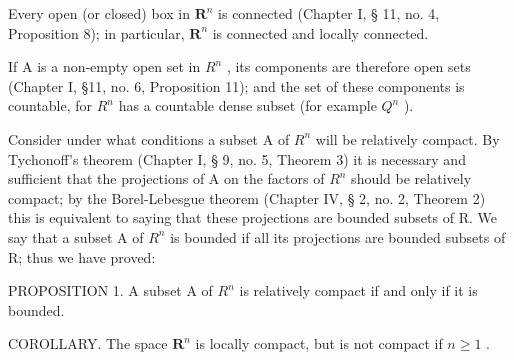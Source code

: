 Every open (or closed) box in \(\mathbf{R}^n\) is connected (Chapter I, § 11, no. 4, Proposition 8); in particular, \(\mathbf{R}^n\) is connected and locally connected.

If A is a non-empty open set in \(R^{n}\) , its components are therefore open sets (Chapter I, §11, no. 6, Proposition 11); and the set of these components is countable, for \(R^{n}\) has a countable dense subset (for example \(Q^{n}\) ).

Consider under what conditions a subset A of \(R^{n}\) will be relatively compact. By Tychonoff's theorem (Chapter I, § 9, no. 5, Theorem 3) it is necessary and sufficient that the projections of A on the factors of \(R^{n}\) should be relatively compact; by the Borel-Lebesgue theorem (Chapter IV, § 2, no. 2, Theorem 2) this is equivalent to saying that these projections are bounded subsets of R. We say that a subset A of \(R^{n}\) is bounded if all its projections are bounded subsets of R; thus we have proved:

PROPOSITION 1. A subset A of \(R^{n}\) is relatively compact if and only if it is bounded.

COROLLARY. The space \(\mathbf{R}^n\) is locally compact, but is not compact if \(n \geqslant 1\) .

